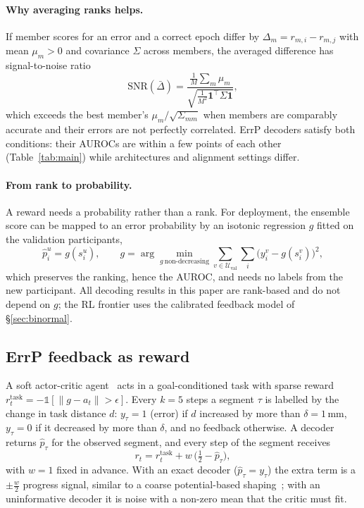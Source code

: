 \paragraph{Why averaging ranks helps.} If member scores for an error and a correct epoch differ by
$\Delta_m=r_{m,i}-r_{m,j}$ with mean $\mu_m>0$ and covariance $\Sigma$ across members, the averaged difference
has signal-to-noise ratio
\begin{equation}
\mathrm{SNR}(\bar\Delta)=\frac{\tfrac1M\sum_m\mu_m}{\sqrt{\tfrac1{M^2}\mathbf 1^\top\Sigma\mathbf 1}},
\label{eq:snr}
\end{equation}
which exceeds the best member's $\mu_m/\sqrt{\Sigma_{mm}}$ when members are comparably accurate and their
errors are not perfectly correlated. ErrP decoders satisfy both conditions: their AUROCs are within a few
points of each other (Table~\ref{tab:main}) while architectures and alignment settings differ.

\paragraph{From rank to probability.} A reward needs a probability rather than a rank. For deployment, the
ensemble score can be mapped to an error probability by an isotonic regression $g$ fitted on the validation
participants,
\begin{equation}
\hat p^u_i=g(s^u_i),\qquad g=\arg\min_{g\ \text{non-decreasing}}\sum_{v\in\mathcal U_{\text{val}}}\sum_i \big(y^v_i-g(s^v_i)\big)^2,
\label{eq:calib}
\end{equation}
which preserves the ranking, hence the AUROC, and needs no labels from the new participant. All decoding results
in this paper are rank-based and do not depend on $g$; the RL frontier uses the calibrated feedback model of
\S\ref{sec:binormal}.

\subsection{ErrP feedback as reward}
\label{sec:reward}
A soft actor-critic agent~\citep{haarnoja2018sac} acts in a goal-conditioned task with sparse reward
$r^{\text{task}}_t=-\mathbb 1[\lVert g-a_t\rVert>\epsilon]$. Every $k=5$ steps a segment $\tau$ is labelled by
the change in task distance $d$: $y_\tau=1$ (error) if $d$ increased by more than $\delta=1$\,mm, $y_\tau=0$ if
it decreased by more than $\delta$, and no feedback otherwise. A decoder returns $\hat p_\tau$ for the observed
segment, and every step of the segment receives
\begin{equation}
r_t=r^{\text{task}}_t+w\,\big(\tfrac12-\hat p_\tau\big),
\label{eq:reward}
\end{equation}
with $w=1$ fixed in advance. With an exact decoder ($\hat p_\tau=y_\tau$) the extra term is a $\pm\tfrac w2$
progress signal, similar to a coarse potential-based shaping~\citep{ng1999policy}; with an uninformative
decoder it is noise with a non-zero mean that the critic must fit.

